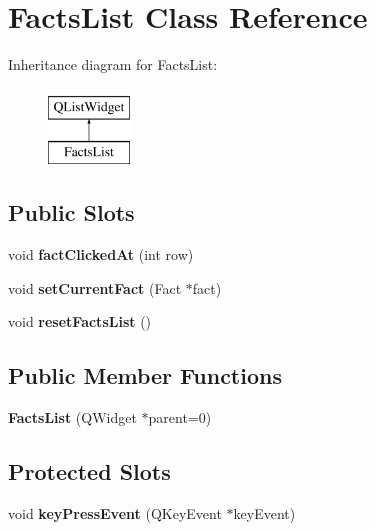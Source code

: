 \hypertarget{class_facts_list}{\section{Facts\-List Class Reference}
\label{class_facts_list}
}
Inheritance diagram for Facts\-List\-:\begin{figure}[H]
\begin{center}
\leavevmode
\includegraphics[height=2.000000cm]{class_facts_list}
\end{center}
\end{figure}
\subsection*{Public Slots}
\begin{DoxyCompactItemize}
\item 
\hypertarget{class_facts_list_a42a0db56c1f8f59d8eb22a09e60ed1ea}{void {\bfseries fact\-Clicked\-At} (int row)}\label{class_facts_list_a42a0db56c1f8f59d8eb22a09e60ed1ea}

\item 
\hypertarget{class_facts_list_a61f7787dafaf23839aea84117aeeae4a}{void {\bfseries set\-Current\-Fact} (Fact $\ast$fact)}\label{class_facts_list_a61f7787dafaf23839aea84117aeeae4a}

\item 
\hypertarget{class_facts_list_a81e08828bde252356eed3e62ecca49f8}{void {\bfseries reset\-Facts\-List} ()}\label{class_facts_list_a81e08828bde252356eed3e62ecca49f8}

\end{DoxyCompactItemize}
\subsection*{Public Member Functions}
\begin{DoxyCompactItemize}
\item 
\hypertarget{class_facts_list_ae70023d8463ebee9c7155417f023db56}{{\bfseries Facts\-List} (Q\-Widget $\ast$parent=0)}\label{class_facts_list_ae70023d8463ebee9c7155417f023db56}

\end{DoxyCompactItemize}
\subsection*{Protected Slots}
\begin{DoxyCompactItemize}
\item 
\hypertarget{class_facts_list_a26d0719771561a0f398a3c252d69122c}{void {\bfseries key\-Press\-Event} (Q\-Key\-Event $\ast$key\-Event)}\label{class_facts_list_a26d0719771561a0f398a3c252d69122c}

\end{DoxyCompactItemize}


